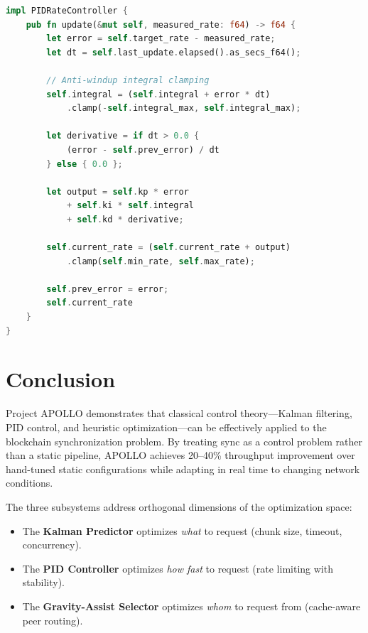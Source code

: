 \documentclass[11pt,a4paper]{article}
\begin{document}
\begin{lstlisting}[language=Rust,caption={PID rate controller with anti-windup}]
impl PIDRateController {
    pub fn update(&mut self, measured_rate: f64) -> f64 {
        let error = self.target_rate - measured_rate;
        let dt = self.last_update.elapsed().as_secs_f64();

        // Anti-windup integral clamping
        self.integral = (self.integral + error * dt)
            .clamp(-self.integral_max, self.integral_max);

        let derivative = if dt > 0.0 {
            (error - self.prev_error) / dt
        } else { 0.0 };

        let output = self.kp * error
            + self.ki * self.integral
            + self.kd * derivative;

        self.current_rate = (self.current_rate + output)
            .clamp(self.min_rate, self.max_rate);

        self.prev_error = error;
        self.current_rate
    }
}
\end{lstlisting}

\section{Conclusion}
\label{sec:conclusion}

Project APOLLO demonstrates that classical control theory---Kalman filtering, PID control, and heuristic optimization---can be effectively applied to the blockchain synchronization problem. By treating sync as a control problem rather than a static pipeline, APOLLO achieves 20--40\% throughput improvement over hand-tuned static configurations while adapting in real time to changing network conditions.

The three subsystems address orthogonal dimensions of the optimization space:
\begin{itemize}
    \item The \textbf{Kalman Predictor} optimizes \emph{what} to request (chunk size, timeout, concurrency).
    \item The \textbf{PID Controller} optimizes \emph{how fast} to request (rate limiting with stability).
    \item The \textbf{Gravity-Assist Selector} optimizes \emph{whom} to request from (cache-aware peer routing).
\end{itemize}
\end{document}
